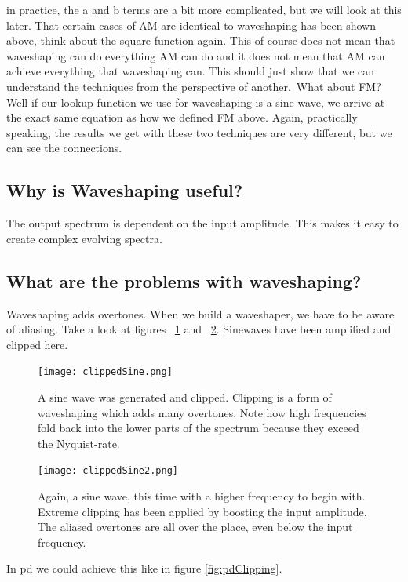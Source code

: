 in practice, the a and b terms are a bit more complicated, but we will look at this later. That certain cases of AM are identical to waveshaping has been shown above, think about the square function again. 
This of course does not mean that waveshaping can do everything AM can do and it does not mean that AM can achieve everything that waveshaping can. This should just show that we can understand the techniques from the perspective of another.\
What about FM? Well if our lookup function we use for waveshaping is a sine wave, we arrive at the exact same equation as how we defined FM above. Again, practically speaking, the results we get with these two techniques are very different, but we can see the connections.


\subsection{Why is Waveshaping useful?}
The output spectrum is dependent on the input amplitude. This makes it easy to create complex evolving spectra.

\subsection{What are the problems with waveshaping?}

Waveshaping adds overtones. When we build a waveshaper, we have to be aware of aliasing. Take a look at figures ~\ref{fig:clipped1} and ~\ref{fig:clipped2}. Sinewaves have been amplified and clipped here. 

\begin{figure}[h!]
	\centering
	\texttt{[image: clippedSine.png]}
	\caption[clipped sine wave]
	{A sine wave was generated and clipped. Clipping is a form of waveshaping which adds many overtones. Note how high frequencies fold back into the lower parts of the spectrum because they exceed the Nyquist-rate.}
	\label{fig:clipped1}
\end{figure}

\begin{figure}[h!]
	\centering
	\texttt{[image: clippedSine2.png]}
	\caption[clipped sine wave 2]
	{Again, a sine wave, this time with a higher frequency to begin with. Extreme clipping has been applied by boosting the input amplitude. The aliased overtones are all over the place, even below the input frequency.}
	\label{fig:clipped2}
\end{figure}

In pd we could achieve this like in figure \ref{fig:pdClipping}.

